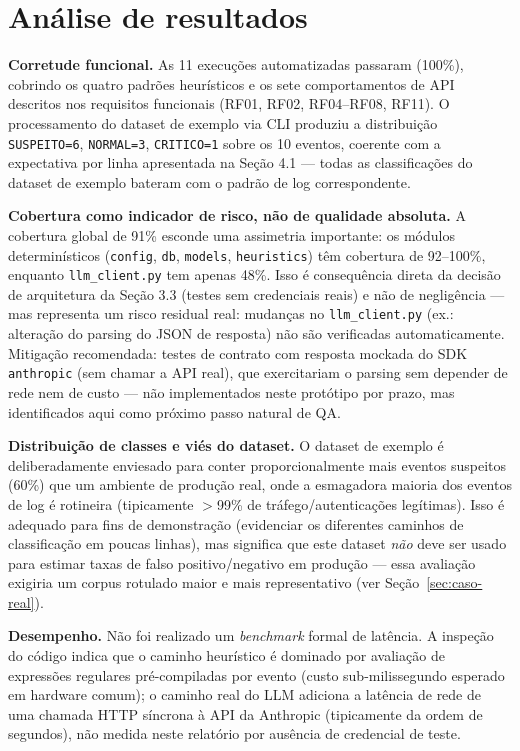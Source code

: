 \documentclass[11pt,a4paper]{article}
\begin{document}
\section{Análise de resultados}
\label{sec:resultados}

\textbf{Corretude funcional.} As 11 execuções automatizadas passaram (100\%), cobrindo
os quatro padrões heurísticos e os sete comportamentos de API descritos nos requisitos
funcionais (RF01, RF02, RF04--RF08, RF11). O processamento do dataset de exemplo via
CLI produziu a distribuição \texttt{SUSPEITO=6}, \texttt{NORMAL=3},
\texttt{CRITICO=1} sobre os 10 eventos, coerente com a expectativa por linha
apresentada na Seção 4.1 --- todas as classificações do dataset de exemplo bateram com
o padrão de log correspondente.

\textbf{Cobertura como indicador de risco, não de qualidade absoluta.} A cobertura
global de 91\% esconde uma assimetria importante: os módulos determinísticos
(\texttt{config}, \texttt{db}, \texttt{models}, \texttt{heuristics}) têm cobertura de
92--100\%, enquanto \texttt{llm\_client.py} tem apenas 48\%. Isso é consequência direta
da decisão de arquitetura da Seção 3.3 (testes sem credenciais reais) e não de
negligência --- mas representa um risco residual real: mudanças no
\texttt{llm\_client.py} (ex.: alteração do parsing do JSON de resposta) não são
verificadas automaticamente. Mitigação recomendada: testes de contrato com resposta
mockada do SDK \texttt{anthropic} (sem chamar a API real), que exercitariam o parsing
sem depender de rede nem de custo --- não implementados neste protótipo por prazo, mas
identificados aqui como próximo passo natural de QA.

\textbf{Distribuição de classes e viés do dataset.} O dataset de exemplo é
deliberadamente enviesado para conter proporcionalmente mais eventos suspeitos (60\%)
que um ambiente de produção real, onde a esmagadora maioria dos eventos de log é
rotineira (tipicamente $>$99\% de tráfego/autenticações legítimas). Isso é adequado
para fins de demonstração (evidenciar os diferentes caminhos de classificação em poucas
linhas), mas significa que este dataset \emph{não} deve ser usado para estimar taxas de
falso positivo/negativo em produção --- essa avaliação exigiria um corpus rotulado
maior e mais representativo (ver Seção~\ref{sec:caso-real}).

\textbf{Desempenho.} Não foi realizado um \emph{benchmark} formal de latência. A
inspeção do código indica que o caminho heurístico é dominado por avaliação de
expressões regulares pré-compiladas por evento (custo sub-milissegundo esperado em
hardware comum); o caminho real do LLM adiciona a latência de rede de uma chamada
HTTP síncrona à API da Anthropic (tipicamente da ordem de segundos), não medida neste
relatório por ausência de credencial de teste.
\end{document}
